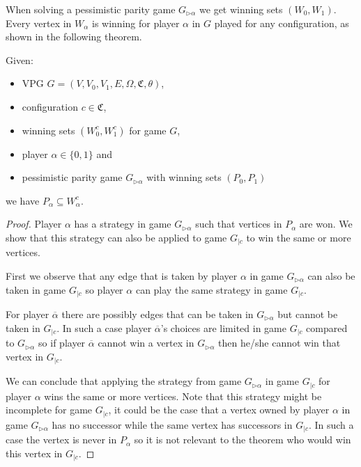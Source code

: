 When solving a pessimistic parity game $G_{\triangleright\alpha}$ we get winning sets $(W_0,W_1)$. Every vertex in $W_\alpha$ is winning for player $\alpha$ in $G$ played for any configuration, as shown in the following theorem.
\begin{theorem}
	\label{the_pess_is_winning_for_all_conf}
	Given:
	\begin{itemize}
		\item VPG $G = (V,V_0,V_1,E,\Omega,\mathfrak{C},\theta)$,
		\item configuration $c \in \mathfrak{C}$,
		\item winning sets $(W_0^c, W_1^c)$ for game $G$,
		\item player $\alpha \in \{0,1\}$ and
		\item pessimistic parity game $G_{\triangleright\alpha}$ with winning sets $(P_0,P_1)$
	\end{itemize}
	we have $P_\alpha \subseteq W_\alpha^c$.
	\begin{proof}
		Player $\alpha$ has a strategy in game $G_{\triangleright\alpha}$ such that vertices in $P_\alpha$ are won. We show that this strategy can also be applied to game $G_{|c}$ to win the same or more vertices.
		
		First we observe that any edge that is taken by player $\alpha$ in game $G_{\triangleright\alpha}$ can also be taken in game $G_{|c}$ so player $\alpha$ can play the same strategy in game $G_{|c}$. 
		
		For player $\overline{\alpha}$ there are possibly edges that can be taken in $G_{\triangleright\alpha}$ but cannot be taken in $G_{|c}$. In such a case player $\overline{\alpha}$'s choices are limited in game $G_{|c}$ compared to $G_{\triangleright\alpha}$ so if player $\overline{\alpha}$ cannot win a vertex in $G_{\triangleright\alpha}$ then he/she cannot win that vertex in $G_{|c}$.
		
		We can conclude that applying the strategy from game $G_{\triangleright\alpha}$ in game $G_{|c}$ for player $\alpha$ wins the same or more vertices. Note that this strategy might be incomplete for game $G_{|c}$, it could be the case that a vertex owned by player $\alpha$ in game $G_{\triangleright\alpha}$ has no successor while the same vertex has successors in $G_{|c}$. In such a case the vertex is never in $P_\alpha$ so it is not relevant to the theorem who would win this vertex in $G_{|c}$.
	\end{proof}
\end{theorem}


